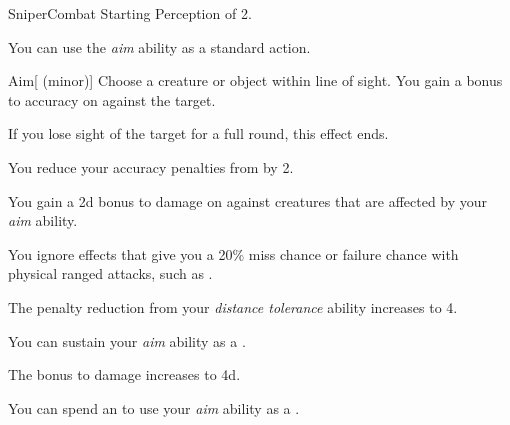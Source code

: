     \begin{feat}{Sniper}{Combat}
        \featpre Starting Perception of 2.

         You can use the \textit{aim} ability as a standard action.
        \begin{freeability}{Aim}[ (minor)]
            Choose a creature or object within line of sight.
            You gain a  bonus to accuracy on  against the target.

            If you lose sight of the target for a full round, this effect ends.
        \end{freeability}

         You reduce your accuracy penalties from  by 2.

         You gain a \plus2d bonus to damage on  against \unaware creatures that are affected by your \textit{aim} ability.

         You ignore effects that give you a 20\% miss chance or failure chance with physical ranged attacks, such as .

         The penalty reduction from your \textit{distance tolerance} ability increases to 4.

         You can sustain your \textit{aim} ability as a .

         The bonus to damage increases to \plus4d.

         You can spend an  to use your \textit{aim} ability as a .
    \end{feat}

